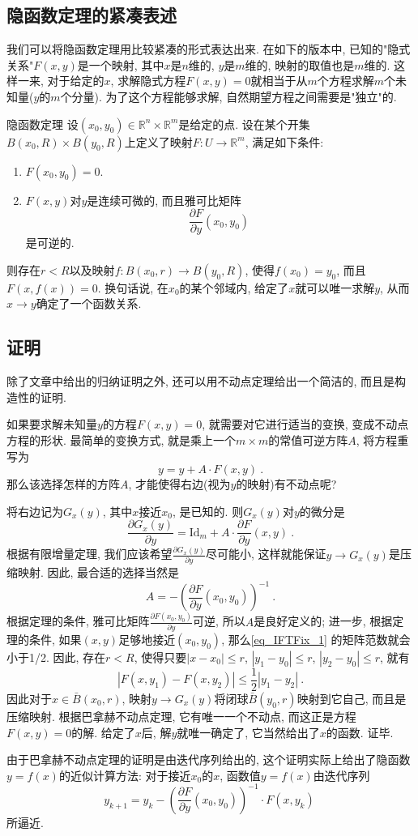 

\subsection{隐函数定理的紧凑表述}
我们可以将隐函数定理用比较紧凑的形式表达出来. 在如下的版本中, 已知的"隐式关系"$F(x,y)$是一个映射, 其中$x$是$n$维的, $y$是$m$维的, 映射的取值也是$m$维的. 这样一来, 对于给定的$x$, 求解隐式方程$F(x,y)=0$就相当于从$m$个方程求解$m$个未知量($y$的$m$个分量). 为了这个方程能够求解, 自然期望方程之间需要是"独立"的.
\begin{theorem}{隐函数定理}
设$(x_0,y_0)\in\mathbb{R}^n\times\mathbb{R}^m$是给定的点. 设在某个开集$B(x_0,R)\times B(y_0,R)$上定义了映射$F:U\to\mathbb{R}^m$, 满足如下条件:
\begin{enumerate}
\item $F(x_0,y_0)=0$.
\item $F(x,y)$对$y$是连续可微的, 而且雅可比矩阵
$$
\frac{\partial F}{\partial y}(x_0,y_0)~
$$
是可逆的.
\end{enumerate}
则存在$r<R$以及映射$f:B(x_0,r)\to B(y_0,R)$, 使得$f(x_0)=y_0$, 而且$F(x,f(x))=0$. 换句话说, 在$x_0$的某个邻域内, 给定了$x$就可以唯一求解$y$, 从而$x\to y$确定了一个函数关系.
\end{theorem}

\subsection{证明}
除了文章中给出的归纳证明之外, 还可以用不动点定理给出一个简洁的, 而且是构造性的证明.

如果要求解未知量$y$的方程$F(x,y)=0$, 就需要对它进行适当的变换, 变成不动点方程的形状. 最简单的变换方式, 就是乘上一个$m\times m$的常值可逆方阵$A$, 将方程重写为
$$
y=y+A\cdot F(x,y)~.
$$
那么该选择怎样的方阵$A$, 才能使得右边(视为$y$的映射)有不动点呢?

将右边记为$G_x(y)$, 其中$x$接近$x_0$, 是已知的. 则$G_x(y)$对$y$的微分是
\begin{equation}\label{eq_IFTFix_1}
\frac{\partial G_x(y)}{\partial y}=\mathrm{Id}_m+A\cdot\frac{\partial F}{\partial y}(x,y)~.
\end{equation}
根据有限增量定理, 我们应该希望$\frac{\partial G_x(y)}{\partial y}$尽可能小, 这样就能保证$y\to G_x(y)$是压缩映射. 因此, 最合适的选择当然是
$$
A=-\left(\frac{\partial F}{\partial y}(x_0,y_0)\right)^{-1}~.
$$
根据定理的条件, 雅可比矩阵$\frac{\partial F(x_0,y_0)}{\partial y}$可逆, 所以$A$是良好定义的; 进一步, 根据定理的条件, 如果$(x,y)$足够地接近$(x_0,y_0)$, 那么\autoref{eq_IFTFix_1} 的矩阵范数就会小于1/2. 因此, 存在$r<R$, 使得只要$|x-x_0|\leq r$, $|y_1-y_0|\leq r$, $|y_2-y_0|\leq r$, 就有
$$
|F(x,y_1)-F(x,y_2)|\leq\frac{1}{2}|y_1-y_2|~.
$$  
因此对于$x\in \bar B(x_0,r)$, 映射$y\to G_x(y)$将闭球$\bar B(y_0,r)$映射到它自己, 而且是压缩映射. 根据巴拿赫不动点定理, 它有唯一一个不动点, 而这正是方程$F(x,y)=0$的解. 给定了$x$后, 解$y$就唯一确定了, 它当然给出了$x$的函数. 证毕.

由于巴拿赫不动点定理的证明是由迭代序列给出的, 这个证明实际上给出了隐函数$y=f(x)$的近似计算方法: 对于接近$x_0$的$x$, 函数值$y=f(x)$由迭代序列
$$
y_{k+1}=y_k-\left(\frac{\partial F}{\partial y}(x_0,y_0)\right)^{-1}\cdot F(x,y_k)~
$$
所逼近.
